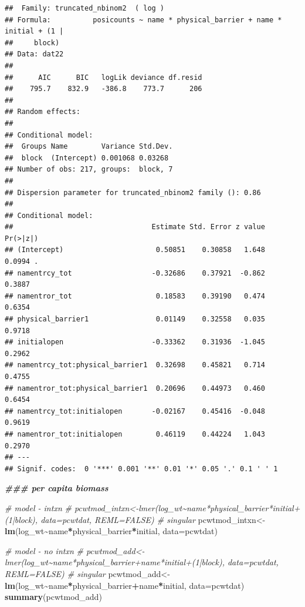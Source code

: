 \documentclass[
]{article}
\newenvironment{Shaded}{\begin{snugshade}}{\end{snugshade}}
\newcommand{\AttributeTok}[1]{\textcolor[rgb]{0.13,0.29,0.53}{#1}}
\newcommand{\CommentTok}[1]{\textcolor[rgb]{0.56,0.35,0.01}{\textit{#1}}}
\newcommand{\DocumentationTok}[1]{\textcolor[rgb]{0.56,0.35,0.01}{\textbf{\textit{#1}}}}
\newcommand{\FunctionTok}[1]{\textcolor[rgb]{0.13,0.29,0.53}{\textbf{#1}}}
\newcommand{\NormalTok}[1]{#1}
\newcommand{\OtherTok}[1]{\textcolor[rgb]{0.56,0.35,0.01}{#1}}
\newcommand{\SpecialCharTok}[1]{\textcolor[rgb]{0.81,0.36,0.00}{\textbf{#1}}}
\begin{document}
\begin{verbatim}
##  Family: truncated_nbinom2  ( log )
## Formula:          posicounts ~ name * physical_barrier + name * initial + (1 |  
##     block)
## Data: dat22
## 
##      AIC      BIC   logLik deviance df.resid 
##    795.7    832.9   -386.8    773.7      206 
## 
## Random effects:
## 
## Conditional model:
##  Groups Name        Variance Std.Dev.
##  block  (Intercept) 0.001068 0.03268 
## Number of obs: 217, groups:  block, 7
## 
## Dispersion parameter for truncated_nbinom2 family (): 0.86 
## 
## Conditional model:
##                                 Estimate Std. Error z value Pr(>|z|)  
## (Intercept)                      0.50851    0.30858   1.648   0.0994 .
## namentrcy_tot                   -0.32686    0.37921  -0.862   0.3887  
## namentror_tot                    0.18583    0.39190   0.474   0.6354  
## physical_barrier1                0.01149    0.32558   0.035   0.9718  
## initialopen                     -0.33362    0.31936  -1.045   0.2962  
## namentrcy_tot:physical_barrier1  0.32698    0.45821   0.714   0.4755  
## namentror_tot:physical_barrier1  0.20696    0.44973   0.460   0.6454  
## namentrcy_tot:initialopen       -0.02167    0.45416  -0.048   0.9619  
## namentror_tot:initialopen        0.46119    0.44224   1.043   0.2970  
## ---
## Signif. codes:  0 '***' 0.001 '**' 0.01 '*' 0.05 '.' 0.1 ' ' 1
\end{verbatim}

\begin{Shaded}
\begin{Highlighting}[]
\DocumentationTok{\#\#\# per capita biomass }

\CommentTok{\# model {-} intxn}
\CommentTok{\# pcwtmod\_intxn\textless{}{-}lmer(log\_wt\textasciitilde{}name*physical\_barrier*initial+(1|block), data=pcwtdat, REML=FALSE) \# singular}
\NormalTok{pcwtmod\_intxn}\OtherTok{\textless{}{-}}\FunctionTok{lm}\NormalTok{(log\_wt}\SpecialCharTok{\textasciitilde{}}\NormalTok{name}\SpecialCharTok{*}\NormalTok{physical\_barrier}\SpecialCharTok{*}\NormalTok{initial, }\AttributeTok{data=}\NormalTok{pcwtdat)}

\CommentTok{\# model {-} no intxn}
\CommentTok{\# pcwtmod\_add\textless{}{-}lmer(log\_wt\textasciitilde{}name*physical\_barrier+name*initial+(1|block), data=pcwtdat, REML=FALSE) \# singular }
\NormalTok{ pcwtmod\_add}\OtherTok{\textless{}{-}}\FunctionTok{lm}\NormalTok{(log\_wt}\SpecialCharTok{\textasciitilde{}}\NormalTok{name}\SpecialCharTok{*}\NormalTok{physical\_barrier}\SpecialCharTok{+}\NormalTok{name}\SpecialCharTok{*}\NormalTok{initial, }\AttributeTok{data=}\NormalTok{pcwtdat) }
\FunctionTok{summary}\NormalTok{(pcwtmod\_add)}
\end{Highlighting}
\end{Shaded}
\end{document}
